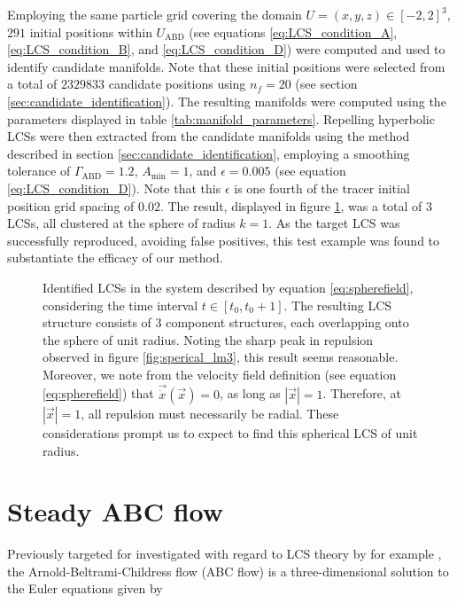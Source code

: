 Employing the same particle grid covering the domain $U = (x,y,z) \in [-2,2]^3$, $291$ initial positions within $U_{\text{ABD}}$ (see equations \eqref{eq:LCS_condition_A}, \eqref{eq:LCS_condition_B}, and \eqref{eq:LCS_condition_D}) were computed and used to identify candidate manifolds. Note that these initial positions were selected from a total of $2329833$ candidate positions using $n_f=20$ (see section \ref{sec:candidate_identification}). The resulting manifolds were computed using the parameters displayed in table \ref{tab:manifold_parameters}. Repelling hyperbolic LCSs were then extracted from the candidate manifolds using the method described in section \ref{sec:candidate_identification}, employing a smoothing tolerance of $\Gamma_{\text{ABD}}=1.2$, $A_{\text{min}}=1$, and $\epsilon=0.005$ (see equation \ref{eq:LCS_condition_D}). Note that this $\epsilon$ is one fourth of the tracer initial position grid spacing of $0.02$. The result, displayed in figure \ref{fig:spherical_LCS}, was a total of $3$ LCSs, all clustered at the sphere of radius $k=1$. As the target LCS was successfully reproduced, avoiding false positives, this test example was found to substantiate the efficacy of our method.

\begin{figure}[h!]
\centering
\resizebox{0.9\textwidth}{!}{}
\caption{Identified LCSs in the system described by equation \eqref{eq:spherefield}, considering the time interval $t\in[t_0,t_0+1]$. The resulting LCS structure consists of $3$ component structures, each overlapping onto the sphere of unit radius. Noting the sharp peak in repulsion observed in figure \ref{fig:sperical_lm3}, this result seems reasonable. Moreover, we note from the velocity field definition (see equation \eqref{eq:spherefield}) that $\vec{\dot{x}}(\vec{x})=0$, as long as $\left|\vec{x}\right|=1$. Therefore, at $\left|\vec{x}\right|=1$, all repulsion must necessarily be radial. These considerations prompt us to expect to find this spherical LCS of unit radius.}\label{fig:spherical_LCS}
\end{figure}

\section{Steady ABC flow}\label{sec:steady_abc_flow}

Previously targeted for investigated with regard to LCS theory by for example \cite{Oettinger}, the Arnold-Beltrami-Childress flow (ABC flow) is a three-dimensional solution to the Euler equations given by

